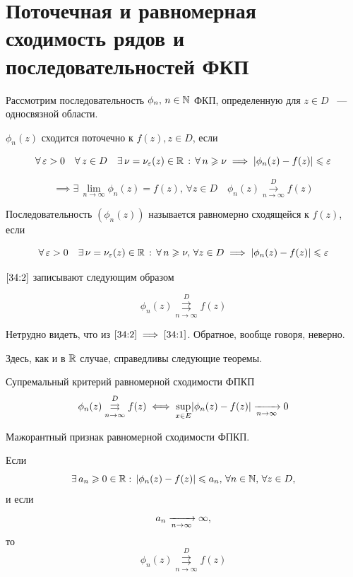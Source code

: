 \documentclass[../../main.tex]{subfiles}
\begin{document}
\section{Поточечная и равномерная сходимость рядов и последовательностей ФКП}

Рассмотрим последовательность $ \phi_n,\, n \in \mathbb{N} $ ФКП, определенную для $ z \in D $ ~--- односвязной области.

$ \phi_n(z) $ сходится поточечно к $ f(z), z \in D $, если

\begin{equation}\label{34:1}
	\forall\, \varepsilon > 0 \quad \forall\, z \in D \quad \exists\, \nu = \nu_\varepsilon (z) \in \mathbb{R}\, :\,
	\forall\, n \geqslant \nu \implies |\phi_n(z) - f(z)| \leqslant \varepsilon
\end{equation}

\[ \implies \exists\, \underset{n \to \infty}{\lim} \phi_n (z) = f(z),\, \forall z \in D \quad \phi_n(z) \overset{D}{\underset{n \to \infty}\longrightarrow} f(z) \]

Последовательность $ (\phi_n(z)) $ называется равномерно сходящейся к $ f(z) $, если

\begin{equation}\label{34:2}
	\forall\, \varepsilon > 0 \quad \exists\, \nu = \nu_\varepsilon (z) \in \mathbb{R}\, :\,
	\forall\, n \geqslant \nu,\, \forall z \in D \implies |\phi_n(z) - f(z)| \leqslant \varepsilon
\end{equation}

$ \eqref{34:2} $ записывают следующим образом

\[ \phi_n(z) \overset{D}{\underset{n \to \infty}\rightrightarrows} f(z) \]

Нетрудно видеть, что из $ \eqref{34:2} \implies \eqref{34:1} $. Обратное, вообще говоря, неверно.

Здесь, как и в $\mathbb{R}$ случае, справедливы следующие теоремы.

\begin{thm}{Супремальный критерий равномерной сходимости ФПКП}
	\[ \phi_n(z) \overset{D}{\underset{n \to \infty}\rightrightarrows} f(z) \iff \underset{x \in E}{\sup}|\phi_n(z) - f(z)| \xrightarrow[n \rightarrow \infty]{} 0 \]
\end{thm}

\begin{thm}{Мажорантный признак равномерной сходимости ФПКП.}
	\;
	
	Если 
	\[ \exists\, a_n \geqslant 0 \in \mathbb{R} :\, |\phi_n(z) - f(z)| \leqslant a_n,\, \forall n \in \mathbb{N},\, \forall z \in D, \]
	и если \[ a_n \xrightarrow[n \rightarrow \infty]{} \infty, \]
	то \[ \phi_n(z) \overset{D}{\underset{n \to \infty}\rightrightarrows} f(z) \]
\end{thm}
\end{document}
